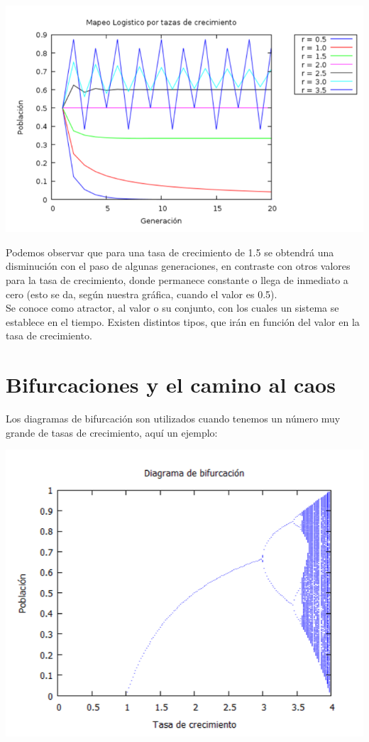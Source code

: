 \documentclass{article}
\begin{document}
\begin{center}
\includegraphics[scale=0.6]{Act101.PNG}
\end{center}
Podemos observar que para una tasa de crecimiento de 1.5 se obtendrá una disminución con el paso de algunas generaciones, en contraste con otros valores para la tasa de crecimiento, donde permanece constante o llega de inmediato a cero (esto se da, según nuestra gráfica, cuando el valor es 0.5).
\\
Se conoce como atractor, al valor o su conjunto, con los cuales un sistema se establece en el tiempo. Existen distintos tipos, que irán en función del valor en la tasa de crecimiento.

\section{Bifurcaciones y el camino al caos}
Los diagramas de bifurcación son utilizados cuando tenemos un número muy grande de tasas de crecimiento, aquí un ejemplo:
\begin{center}
\includegraphics[scale=0.5]{Act102.PNG}
\end{center}
\end{document}
